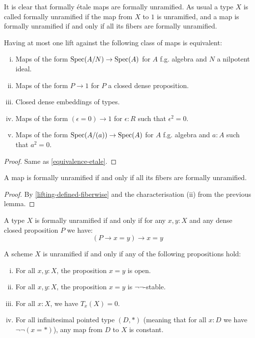 It is clear that formally étale maps are formally unramified. As usual a type $X$ is called formally unramified if the map from $X$ to $1$ is unramified, and a map is formally unramified if and only if all its fibers are formally unramified.

\begin{lemma}
\label{equivalence-unramified}
Having at most one lift against the following class of maps is equivalent:
\begin{enumerate}[(i)]
\item Maps of the form $\operatorname{Spec}(A/N)\to \operatorname{Spec}(A)$ for $A$ f.g. algebra and $N$ a nilpotent ideal.
\item Maps of the form $P\to 1$ for $P$ a closed dense proposition.
\item Closed dense embeddings of types.
\item Maps of the form $(\epsilon=0)\to 1$ for $\epsilon:R$ such that $\epsilon^2=0$.
\item Maps of the form $\operatorname{Spec}(A/(a)) \to \operatorname{Spec}(A)$ for $A$ f.g. algebra and $a:A$ such that $a^2=0$.
\end{enumerate}
\end{lemma}

\begin{proof}
Same as \cref{equivalence-etale}.
\end{proof}

\begin{lemma}
A map is formally unramified if and only if all its fibers are formally unramified.
\end{lemma}

\begin{proof}
By \cref{lifting-defined-fiberwise} and the characterisation (ii) from the previous lemma.
\end{proof}

\begin{lemma}
A type $X$ is formally unramified if and only if for any $x,y:X$ and any dense closed proposition $P$ we have:
\[
(P\to x=y)\to x=y
\]
\end{lemma}

\begin{proposition}
A scheme $X$ is unramified if and only if any of the following propositions hold:
  \begin{enumerate}[(i)]
  \item For all $x,y:X$, the proposition $x=y$ is open.
  \item For all $x,y:X$, the proposition $x=y$ is $\neg\neg$-stable.
  \item For all $x:X$, we have $T_x(X)=0$.
  \item For all infinitesimal pointed type $(D,*)$ (meaning that for all $x:D$ we have $\neg\neg(x=*)$), any map from $D$ to $X$ is constant.
  \end{enumerate}
\end{proposition}

